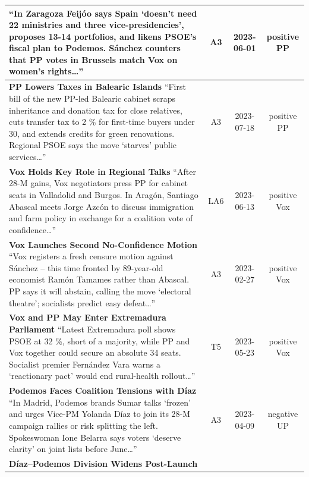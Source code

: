 \documentclass[12pt]{article}
\begin{document}
\begin{longtable}{|p{8cm}|c|c|c|}
	{\scriptsize
		“In Zaragoza Feijóo says Spain ‘doesn’t need 22 ministries and three vice-presidencies’, proposes 13-14 portfolios, and likens PSOE’s fiscal plan to Podemos.  
		Sánchez counters that PP votes in Brussels match Vox on women’s rights…”}
	& A3 & 2023-06-01 & positive PP\\
	\hline
	\textbf{PP Lowers Taxes in Balearic Islands}\newline
	{\scriptsize
		“First bill of the new PP-led Balearic cabinet scraps inheritance and donation tax for close relatives, cuts transfer tax to 2 \% for first-time buyers under 30, and extends credits for green renovations.  
		Regional PSOE says the move ‘starves’ public services…”}
	& A3 & 2023-07-18 & positive PP\\
	\hline
	\textbf{Vox Holds Key Role in Regional Talks}\newline
	{\scriptsize
		“After 28-M gains, Vox negotiators press PP for cabinet seats in Valladolid and Burgos.  
		In Aragón, Santiago Abascal meets Jorge Azcón to discuss immigration and farm policy in exchange for a coalition vote of confidence…”}
	& LA6 & 2023-06-13 & positive Vox\\
	\hline
	\textbf{Vox Launches Second No-Confidence Motion}\newline
	{\scriptsize
		“Vox registers a fresh censure motion against Sánchez – this time fronted by 89-year-old economist Ramón Tamames rather than Abascal.  
		PP says it will abstain, calling the move ‘electoral theatre’; socialists predict easy defeat…”}
	& A3 & 2023-02-27 & positive Vox\\
	\hline
	\textbf{Vox and PP May Enter Extremadura Parliament}\newline
	{\scriptsize
		“Latest Extremadura poll shows PSOE at 32 \%, short of a majority, while PP and Vox together could secure an absolute 34 seats.  
		Socialist premier Fernández Vara warns a ‘reactionary pact’ would end rural-health rollout…”}
	& T5 & 2023-05-23 & positive Vox\\
	\hline
	\textbf{Podemos Faces Coalition Tensions with Díaz}\newline
	{\scriptsize
		“In Madrid, Podemos brands Sumar talks ‘frozen’ and urges Vice-PM Yolanda Díaz to join its 28-M campaign rallies or risk splitting the left.  
		Spokeswoman Ione Belarra says voters ‘deserve clarity’ on joint lists before June…”}
	& A3 & 2023-04-09 & negative UP\\
	\hline
	\textbf{Díaz–Podemos Division Widens Post-Launch}\newline

\end{longtable}
\end{document}
